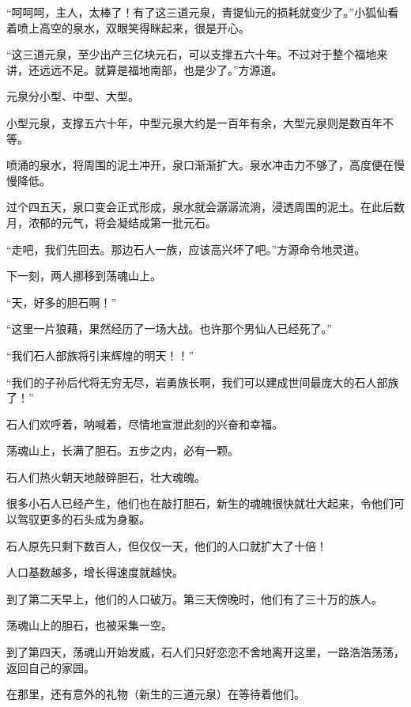 \begin{this_body}
“呵呵呵，主人，太棒了！有了这三道元泉，青提仙元的损耗就变少了。”小狐仙看着喷上高空的泉水，双眼笑得眯起来，很是开心。

“这三道元泉，至少出产三亿块元石，可以支撑五六十年。不过对于整个福地来讲，还远远不足。就算是福地南部，也是少了。”方源道。

元泉分小型、中型、大型。

小型元泉，支撑五六十年，中型元泉大约是一百年有余，大型元泉则是数百年不等。

喷涌的泉水，将周围的泥土冲开，泉口渐渐扩大。泉水冲击力不够了，高度便在慢慢降低。

过个四五天，泉口变会正式形成，泉水就会潺潺流淌，浸透周围的泥土。在此后数月，浓郁的元气，将会凝结成第一批元石。

“走吧，我们先回去。那边石人一族，应该高兴坏了吧。”方源命令地灵道。

下一刻，两人挪移到荡魂山上。

“天，好多的胆石啊！”

“这里一片狼藉，果然经历了一场大战。也许那个男仙人已经死了。”

“我们石人部族将引来辉煌的明天！！”

“我们的子孙后代将无穷无尽，岩勇族长啊，我们可以建成世间最庞大的石人部族了！”

石人们欢呼着，呐喊着，尽情地宣泄此刻的兴奋和幸福。

荡魂山上，长满了胆石。五步之内，必有一颗。

石人们热火朝天地敲碎胆石，壮大魂魄。

很多小石人已经产生，他们也在敲打胆石，新生的魂魄很快就壮大起来，令他们可以驾驭更多的石头成为身躯。

石人原先只剩下数百人，但仅仅一天，他们的人口就扩大了十倍！

人口基数越多，增长得速度就越快。

到了第二天早上，他们的人口破万。第三天傍晚时，他们有了三十万的族人。

荡魂山上的胆石，也被采集一空。

到了第四天，荡魂山开始发威，石人们只好恋恋不舍地离开这里，一路浩浩荡荡，返回自己的家园。

在那里，还有意外的礼物（新生的三道元泉）在等待着他们。

\end{this_body}

